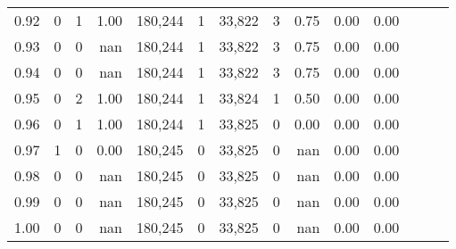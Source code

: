 \begin{tabular}{rrrrrrrrrrrrrr}
0.92 &      0 &    1 &  1.00 &  180,244 &        1 &  33,822 &       3 &  0.75 &  0.00 &      0.00 \\
0.93 &      0 &    0 &   nan &  180,244 &        1 &  33,822 &       3 &  0.75 &  0.00 &      0.00 \\
0.94 &      0 &    0 &   nan &  180,244 &        1 &  33,822 &       3 &  0.75 &  0.00 &      0.00 \\
0.95 &      0 &    2 &  1.00 &  180,244 &        1 &  33,824 &       1 &  0.50 &  0.00 &      0.00 \\
0.96 &      0 &    1 &  1.00 &  180,244 &        1 &  33,825 &       0 &  0.00 &  0.00 &      0.00 \\
0.97 &      1 &    0 &  0.00 &  180,245 &        0 &  33,825 &       0 &   nan &  0.00 &      0.00 \\
0.98 &      0 &    0 &   nan &  180,245 &        0 &  33,825 &       0 &   nan &  0.00 &      0.00 \\
0.99 &      0 &    0 &   nan &  180,245 &        0 &  33,825 &       0 &   nan &  0.00 &      0.00 \\
1.00 &      0 &    0 &   nan &  180,245 &        0 &  33,825 &       0 &   nan &  0.00 &      0.00 \\
\bottomrule
\end{tabular}
